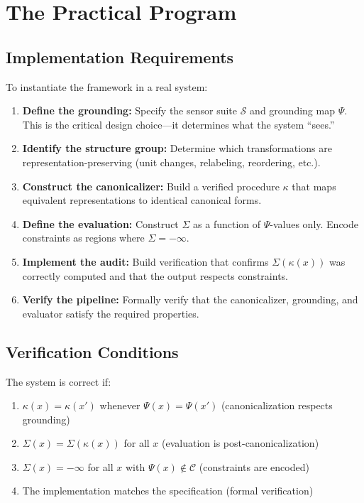 \documentclass[12pt]{article}
\begin{document}
\section{The Practical Program}

\subsection{Implementation Requirements}

To instantiate the framework in a real system:

\begin{enumerate}
    \item \textbf{Define the grounding:} Specify the sensor suite $\mathcal{S}$ and grounding map $\Psi$. This is the critical design choice---it determines what the system ``sees.''

    \item \textbf{Identify the structure group:} Determine which transformations are representation-preserving (unit changes, relabeling, reordering, etc.).

    \item \textbf{Construct the canonicalizer:} Build a verified procedure $\kappa$ that maps equivalent representations to identical canonical forms.

    \item \textbf{Define the evaluation:} Construct $\Sigma$ as a function of $\Psi$-values only. Encode constraints as regions where $\Sigma = -\infty$.

    \item \textbf{Implement the audit:} Build verification that confirms $\Sigma(\kappa(x))$ was correctly computed and that the output respects constraints.

    \item \textbf{Verify the pipeline:} Formally verify that the canonicalizer, grounding, and evaluator satisfy the required properties.
\end{enumerate}

\subsection{Verification Conditions}

The system is correct if:

\begin{enumerate}
    \item $\kappa(x) = \kappa(x')$ whenever $\Psi(x) = \Psi(x')$ (canonicalization respects grounding)
    \item $\Sigma(x) = \Sigma(\kappa(x))$ for all $x$ (evaluation is post-canonicalization)
    \item $\Sigma(x) = -\infty$ for all $x$ with $\Psi(x) \notin \mathcal{C}$ (constraints are encoded)
    \item The implementation matches the specification (formal verification)
\end{enumerate}
\end{document}
